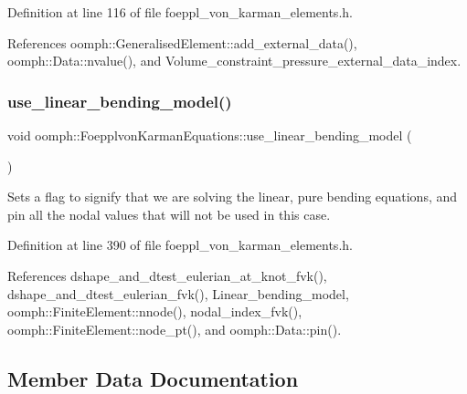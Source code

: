 Definition at line 116 of file foeppl\+\_\+von\+\_\+karman\+\_\+elements.\+h.



References oomph\+::\+Generalised\+Element\+::add\+\_\+external\+\_\+data(), oomph\+::\+Data\+::nvalue(), and Volume\+\_\+constraint\+\_\+pressure\+\_\+external\+\_\+data\+\_\+index.

\mbox{\label{classoomph_1_1FoepplvonKarmanEquations_a64bc4611548789281d0fcdc4d306d14a}} 
\subsubsection{\texorpdfstring{use\+\_\+linear\+\_\+bending\+\_\+model()}{use\_linear\_bending\_model()}}
{\footnotesize\ttfamily void oomph\+::\+Foepplvon\+Karman\+Equations\+::use\+\_\+linear\+\_\+bending\+\_\+model (\begin{DoxyParamCaption}{ }\end{DoxyParamCaption})\hspace{0.3cm}{\ttfamily [inline]}}



Sets a flag to signify that we are solving the linear, pure bending equations, and pin all the nodal values that will not be used in this case. 



Definition at line 390 of file foeppl\+\_\+von\+\_\+karman\+\_\+elements.\+h.



References dshape\+\_\+and\+\_\+dtest\+\_\+eulerian\+\_\+at\+\_\+knot\+\_\+fvk(), dshape\+\_\+and\+\_\+dtest\+\_\+eulerian\+\_\+fvk(), Linear\+\_\+bending\+\_\+model, oomph\+::\+Finite\+Element\+::nnode(), nodal\+\_\+index\+\_\+fvk(), oomph\+::\+Finite\+Element\+::node\+\_\+pt(), and oomph\+::\+Data\+::pin().



\subsection{Member Data Documentation}
\mbox{\label{classoomph_1_1FoepplvonKarmanEquations_ae30745c66511b2bd1beeda30050814d7}} 
